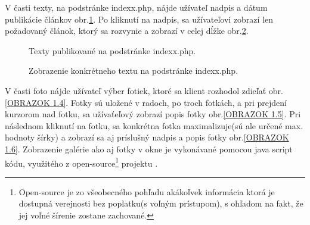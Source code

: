 
V časti texty, na podstránke indexx.php, nájde užívateľ nadpis a dátum publikácie článkov obr.\ref{OBRAZOK 1.2}. Po kliknutí na nadpis, sa užívateľovi zobrazí len požadovaný článok, ktorý sa rozvynie a zobrazí v celej dĺžke obr.\ref{OBRAZOK 1.3}.

\begin{figure}[!tbh]
\centering
\setlength{\fboxsep}{0pt}%
\setlength{\fboxrule}{1pt}%
\caption{Texty publikované na podstránke indexx.php.}\label{OBRAZOK 1.2}
\end{figure}

\begin{figure}[!tbh]
\centering
\setlength{\fboxsep}{0pt}%
\setlength{\fboxrule}{1pt}%
\caption{Zobrazenie konkrétneho textu na podstránke indexx.php.}\label{OBRAZOK 1.3}
\end{figure}

\vspace{5cm}

V časti foto nájde užívateľ výber fotiek, ktoré sa klient rozhodol zdieľať obr.\ref{OBRAZOK 1.4}. Fotky sú uložené v radoch, po troch fotkách, a pri prejdení kurzorom nad fotku, sa užívaťeľový zobrazí popis fotky obr.\ref{OBRAZOK 1.5}. Pri následnom kliknutí na fotku, sa konkrétna fotka maximalizuje(sú ale určené max. hodnoty šírky) a zobrazí sa aj príslušný nadpis a popis fotky obr.\ref{OBRAZOK 1.6}. Zobrazenie galérie ako aj fotky v okne je vykonávané pomocou java script kódu, využitého z open-source\footnote[2]{Open-source je zo všeobecného pohľadu akákoľvek informácia ktorá je dostupná verejnosti bez poplatku(s voľným prístupom), s ohľadom na fakt, že jej voľné šírenie zostane zachované.} projektu\cite{Gallery} .

